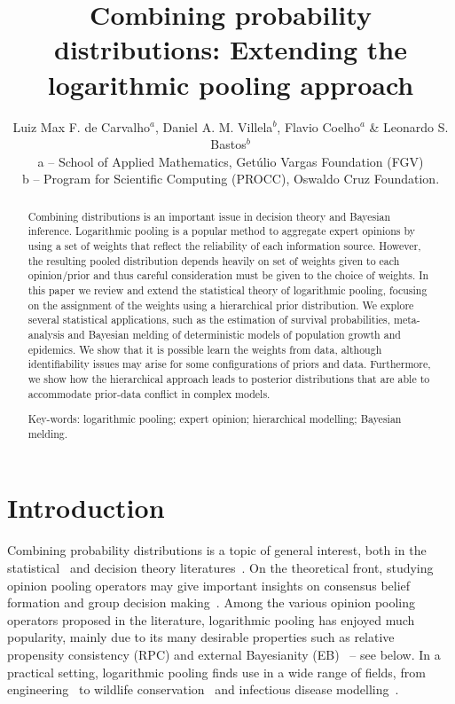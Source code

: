 \documentclass[a4paper, notitlepage, 11pt]{article}
\title{\vspace{-9ex}\centering \bf Combining probability distributions: Extending the logarithmic pooling approach
}
\author{
Luiz Max F. de Carvalho$^{a}$, Daniel A. M. Villela$^b$, Flavio Coelho$^a$ \& Leonardo S. Bastos$^b$ \\
a -- School of Applied Mathematics, Get\'ulio Vargas Foundation (FGV)\\
b -- Program for Scientific Computing (PROCC), Oswaldo Cruz Foundation. \\
}
\begin{document}
\maketitle

\begin{abstract}
Combining distributions is an important issue in decision theory and Bayesian inference.
Logarithmic pooling is a popular method to aggregate expert opinions by using a set of weights that reflect the reliability of each information source.
However, the resulting pooled distribution depends heavily on set of weights given to each opinion/prior and thus careful consideration must be given to the choice of weights.
In this paper we review and extend the statistical theory of logarithmic pooling, focusing on the assignment of the weights using a hierarchical prior distribution. 
We explore several statistical applications, such as the estimation of survival probabilities, meta-analysis and Bayesian melding of deterministic models of population growth and epidemics.
We show that it is possible learn the weights from data, although identifiability issues may arise for some configurations of priors and data.
Furthermore, we show how the hierarchical approach leads to posterior distributions that are able to accommodate prior-data conflict in complex models.

Key-words: logarithmic pooling; expert opinion; hierarchical modelling; Bayesian melding. 
\end{abstract}

\section{Introduction}
\label{sec:intro}

Combining probability distributions is a topic of general interest, both in the statistical~\citep{West1984, Genest1986A, Genest1986B} and decision theory literatures~\citep{Genest1984,French1985,Pennock1997,Guardoni2002}.
On the theoretical front, studying opinion pooling operators may give important insights on consensus belief formation and group decision making~\citep{West1984,Genest1986B,Guardoni2002}.
Among the various opinion pooling operators proposed in the literature, logarithmic pooling has enjoyed much popularity, mainly due to its many desirable properties such as relative propensity consistency (RPC) and external Bayesianity (EB)~\citep{Genest1986A} -- see below. 
In a practical setting, logarithmic pooling finds use in a wide range of fields, from engineering~\citep{Lind1988,Savchuk1994} to wildlife conservation~\citep{Poole2000} and infectious disease modelling~\citep{Coelho2009}. 
\end{document}

